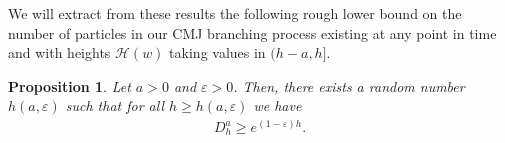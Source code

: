 \documentclass[a4,12pt]{amsart}
\numberwithin{equation}{section}
\newtheorem{lemma}[thm]{Lemma}
\newtheorem{proposition}[thm]{Proposition}
\begin{document}
\color{black}

We will extract from these results the following rough lower bound on the number of particles in our CMJ branching process existing at any point in time and with heights $\mathcal{H}(w)$ taking values in $(h-a,h]$.

\begin{proposition} \label{prop:heightlower}
Let $a > 0$ and $\varepsilon > 0$. Then, there exists a random number $h(a,\varepsilon)$ such that for all $h \geq h(a,\varepsilon)$ we have
\begin{align*}
D_h^a \geq e^{ (1 - \varepsilon) h}.
\end{align*}
\end{proposition}
\end{document}
